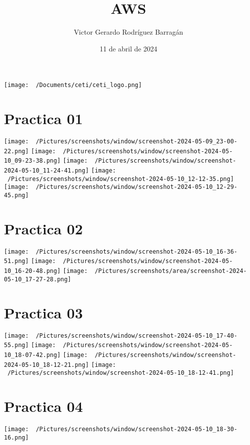 \documentclass{article}
\title{AWS}
\author{Victor Gerardo Rodríguez Barragán}
\date{11 de abril de 2024}
\begin{document}
\maketitle
\texttt{[image: ~/Documents/ceti/ceti\_logo.png]}
\newpage
\justify
\section{Practica 01}
\texttt{[image: ~/Pictures/screenshots/window/screenshot-2024-05-09\_23-00-22.png]}
\texttt{[image: ~/Pictures/screenshots/window/screenshot-2024-05-10\_09-23-38.png]}
\texttt{[image: ~/Pictures/screenshots/window/screenshot-2024-05-10\_11-24-41.png]}
\texttt{[image: ~/Pictures/screenshots/window/screenshot-2024-05-10\_12-12-35.png]}
\texttt{[image: ~/Pictures/screenshots/window/screenshot-2024-05-10\_12-29-45.png]}

\section{Practica 02}
\texttt{[image: ~/Pictures/screenshots/window/screenshot-2024-05-10\_16-36-51.png]}
\texttt{[image: ~/Pictures/screenshots/window/screenshot-2024-05-10\_16-20-48.png]}
\texttt{[image: ~/Pictures/screenshots/area/screenshot-2024-05-10\_17-27-28.png]}

\section{Practica 03}
\texttt{[image: ~/Pictures/screenshots/window/screenshot-2024-05-10\_17-40-55.png]}
\texttt{[image: ~/Pictures/screenshots/window/screenshot-2024-05-10\_18-07-42.png]}
\texttt{[image: ~/Pictures/screenshots/window/screenshot-2024-05-10\_18-12-21.png]}
\texttt{[image: ~/Pictures/screenshots/window/screenshot-2024-05-10\_18-12-41.png]}

\section{Practica 04}
\texttt{[image: ~/Pictures/screenshots/window/screenshot-2024-05-10\_18-30-16.png]}
\end{document}

